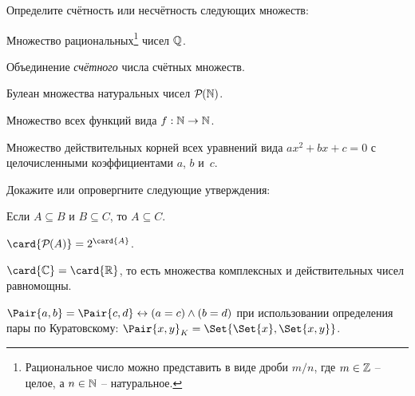 \documentclass[a4paper,12pt]{article}
\begin{document}
\begin{tasks}
    \item Определите счётность или несчётность следующих множеств:

    \begin{subtasks}
        \item Множество рациональных\footnote{Рациональное число можно представить в виде дроби $m / n$, где $m \in \mathbb{Z}$ \--- целое, а $n \in \mathbb{N}$ \--- натуральное.} чисел $\mathbb{Q}$.
        \item Объединение \textit{счётного} числа счётных множеств.
        \item Булеан множества натуральных чисел $\mathcal{P}\mkern-1mu({\mathbb{N}})$.
        \item Множество всех функций вида $f : \mathbb{N} \to \mathbb{N}$.
        \item Множество действительных корней всех уравнений вида $ax^2 + bx + c = 0$ с целочисленными коэффициентами $a$, $b$ и~$c$.
    \end{subtasks}


    \item Докажите или опровергните следующие утверждения:

    \begin{subtasks}
        \item Если $A \subseteq B$ и $B \subseteq C$, то $A \subseteq C$.
        \item $\card{\powerset{A}} = 2^{\card{A}}$.
        \item $\card{\Complex} = \card{\Real}$, то есть множества комплексных и действительных чисел равномощны.
        \item $\Pair{a,b} = \Pair{c,d} \iff (a = c) \land (b = d)$ при использовании определения пары по Куратовскому: $\Pair{x, y}_K = \Set{\Set{x}, \Set{x, y}}$.
    \end{subtasks}

\end{tasks}
\end{document}
